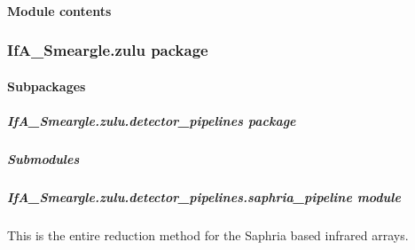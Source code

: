 \documentclass[letterpaper,10pt,english]{sphinxmanual}
\begin{document}
\paragraph{Module contents}
\label{\detokenize{python_docstrings/IfA_Smeargle.yankee:module-IfA_Smeargle.yankee}}\label{\detokenize{python_docstrings/IfA_Smeargle.yankee:module-contents}}

\subsubsection{IfA\_Smeargle.zulu package}
\label{\detokenize{python_docstrings/IfA_Smeargle.zulu:ifa-smeargle-zulu-package}}\label{\detokenize{python_docstrings/IfA_Smeargle.zulu::doc}}

\paragraph{Subpackages}
\label{\detokenize{python_docstrings/IfA_Smeargle.zulu:subpackages}}

\subparagraph{IfA\_Smeargle.zulu.detector\_pipelines package}
\label{\detokenize{python_docstrings/IfA_Smeargle.zulu.detector_pipelines:ifa-smeargle-zulu-detector-pipelines-package}}\label{\detokenize{python_docstrings/IfA_Smeargle.zulu.detector_pipelines::doc}}

\subparagraph{Submodules}
\label{\detokenize{python_docstrings/IfA_Smeargle.zulu.detector_pipelines:submodules}}

\subparagraph{IfA\_Smeargle.zulu.detector\_pipelines.saphria\_pipeline module}
\label{\detokenize{python_docstrings/IfA_Smeargle.zulu.detector_pipelines.saphria_pipeline:module-IfA_Smeargle.zulu.detector_pipelines.saphria_pipeline}}\label{\detokenize{python_docstrings/IfA_Smeargle.zulu.detector_pipelines.saphria_pipeline:ifa-smeargle-zulu-detector-pipelines-saphria-pipeline-module}}\label{\detokenize{python_docstrings/IfA_Smeargle.zulu.detector_pipelines.saphria_pipeline::doc}}
This is the entire reduction method for the Saphria based infrared arrays.
\end{document}
